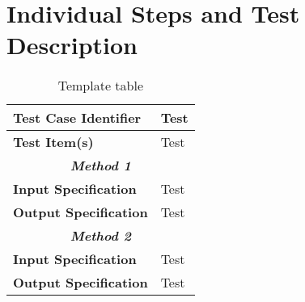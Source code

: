 
\chapter{Individual Steps and Test Description}
\blindtext

\begin{table}[h]
	\begin{tabularx}{\textwidth}{l X}
		\hline
		\textbf{Test Case Identifier}	&	Test\\	\hline
		\textbf{Test Item(s)}			&	Test\\	\hline\hline
		\multicolumn{2}{c}{\textbf{\textit{Method 1}}}	\\	\hline\hline
		\textbf{Input Specification}	&	Test\\	\hline
		\textbf{Output Specification}	&	Test\\	\hline\hline
				\multicolumn{2}{c}{\textbf{\textit{Method 2}}}	\\	\hline\hline
		\textbf{Input Specification}	&	Test\\	\hline
		\textbf{Output Specification}	&	Test\\	\hline
	\end{tabularx}
	\captionsetup{textformat=empty,labelformat=blank}
	\caption{Template table}
	\label{table:template-table}
\end{table}
